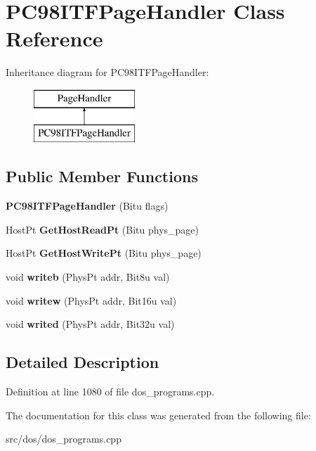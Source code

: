 \hypertarget{classPC98ITFPageHandler}{\section{P\-C98\-I\-T\-F\-Page\-Handler Class Reference}
\label{classPC98ITFPageHandler}
}
Inheritance diagram for P\-C98\-I\-T\-F\-Page\-Handler\-:\begin{figure}[H]
\begin{center}
\leavevmode
\includegraphics[height=2.000000cm]{classPC98ITFPageHandler}
\end{center}
\end{figure}
\subsection*{Public Member Functions}
\begin{DoxyCompactItemize}
\item 
\hypertarget{classPC98ITFPageHandler_a04944f2dfee9ee653ca0bfd4da327d72}{{\bfseries P\-C98\-I\-T\-F\-Page\-Handler} (Bitu flags)}\label{classPC98ITFPageHandler_a04944f2dfee9ee653ca0bfd4da327d72}

\item 
\hypertarget{classPC98ITFPageHandler_abc27a522e5012fb74276d27cc5d11c82}{Host\-Pt {\bfseries Get\-Host\-Read\-Pt} (Bitu phys\-\_\-page)}\label{classPC98ITFPageHandler_abc27a522e5012fb74276d27cc5d11c82}

\item 
\hypertarget{classPC98ITFPageHandler_a06c34515bcd91a529b3154bfc07204e7}{Host\-Pt {\bfseries Get\-Host\-Write\-Pt} (Bitu phys\-\_\-page)}\label{classPC98ITFPageHandler_a06c34515bcd91a529b3154bfc07204e7}

\item 
\hypertarget{classPC98ITFPageHandler_ae2282ea79d18dabcbc9f1ab7189dbdd2}{void {\bfseries writeb} (Phys\-Pt addr, Bit8u val)}\label{classPC98ITFPageHandler_ae2282ea79d18dabcbc9f1ab7189dbdd2}

\item 
\hypertarget{classPC98ITFPageHandler_a63aa204dc91f52298a4a0134488c80e0}{void {\bfseries writew} (Phys\-Pt addr, Bit16u val)}\label{classPC98ITFPageHandler_a63aa204dc91f52298a4a0134488c80e0}

\item 
\hypertarget{classPC98ITFPageHandler_a9d5683f0ea20ff690135bf269a627ba9}{void {\bfseries writed} (Phys\-Pt addr, Bit32u val)}\label{classPC98ITFPageHandler_a9d5683f0ea20ff690135bf269a627ba9}

\end{DoxyCompactItemize}


\subsection{Detailed Description}


Definition at line 1080 of file dos\-\_\-programs.\-cpp.



The documentation for this class was generated from the following file\-:\begin{DoxyCompactItemize}
\item 
src/dos/dos\-\_\-programs.\-cpp\end{DoxyCompactItemize}
